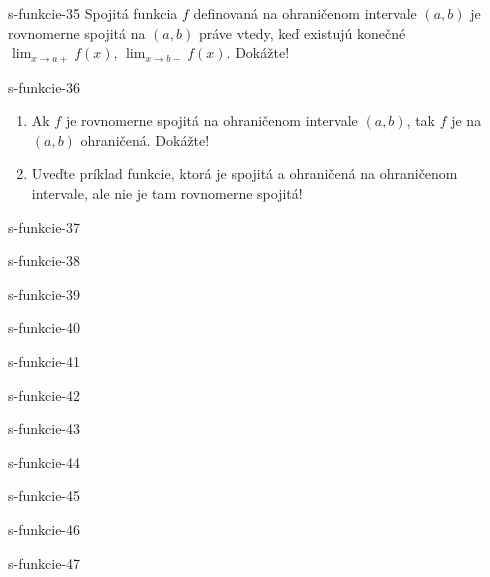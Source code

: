 	\begin{defproblem}{s-funkcie-35}
	Spojitá funkcia $f$ definovaná na ohraničenom intervale $(a,b)$ je rovnomerne spojitá na $(a,b)$ práve vtedy, keď existujú konečné $\lim_{x \rightarrow a+}f(x)$, $\lim_{x \rightarrow b-}f(x)$. Dokážte!
	\end{defproblem}
	
	\begin{defproblem}{s-funkcie-36}
	\begin{enumerate}
	\item Ak $f$ je rovnomerne spojitá na ohraničenom intervale $(a,b)$, tak $f$ je na $(a,b)$ ohraničená. Dokážte!
    \item Uveďte príklad funkcie, ktorá je spojitá a ohraničená na ohraničenom intervale, ale nie je tam rovnomerne spojitá!
	\end{enumerate}
	\end{defproblem}
	
	\begin{defproblem}{s-funkcie-37}
	
	\end{defproblem}
	
	\begin{defproblem}{s-funkcie-38}
	
	\end{defproblem}
	
	\begin{defproblem}{s-funkcie-39}
	
	\end{defproblem}
	
	\begin{defproblem}{s-funkcie-40}
	
	\end{defproblem}
	
	\begin{defproblem}{s-funkcie-41}
	
	\end{defproblem}
	
	\begin{defproblem}{s-funkcie-42}
	
	\end{defproblem}
	
	\begin{defproblem}{s-funkcie-43}
	
	\end{defproblem}
	
	\begin{defproblem}{s-funkcie-44}
	
	\end{defproblem}
	
	\begin{defproblem}{s-funkcie-45}
	
	\end{defproblem}
	
	\begin{defproblem}{s-funkcie-46}
	
	\end{defproblem}
	
	\begin{defproblem}{s-funkcie-47}
	
	\end{defproblem}